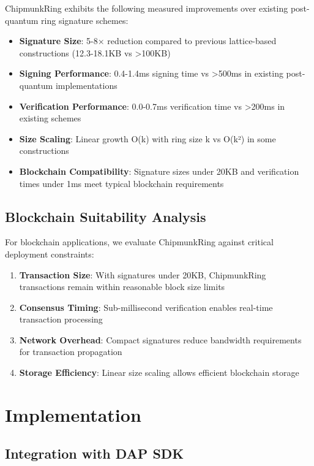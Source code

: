 \documentclass[11pt,a4paper]{article}
\begin{document}
ChipmunkRing exhibits the following measured improvements over existing post-quantum ring signature schemes:

\begin{itemize}
\item \textbf{Signature Size}: 5-8× reduction compared to previous lattice-based constructions (12.3-18.1KB vs >100KB)
\item \textbf{Signing Performance}: 0.4-1.4ms signing time vs >500ms in existing post-quantum implementations  
\item \textbf{Verification Performance}: 0.0-0.7ms verification time vs >200ms in existing schemes
\item \textbf{Size Scaling}: Linear growth O(k) with ring size k vs O(k²) in some constructions
\item \textbf{Blockchain Compatibility}: Signature sizes under 20KB and verification times under 1ms meet typical blockchain requirements
\end{itemize}

\subsection{Blockchain Suitability Analysis}

For blockchain applications, we evaluate ChipmunkRing against critical deployment constraints:

\begin{enumerate}
\item \textbf{Transaction Size}: With signatures under 20KB, ChipmunkRing transactions remain within reasonable block size limits
\item \textbf{Consensus Timing}: Sub-millisecond verification enables real-time transaction processing
\item \textbf{Network Overhead}: Compact signatures reduce bandwidth requirements for transaction propagation
\item \textbf{Storage Efficiency}: Linear size scaling allows efficient blockchain storage
\end{enumerate}

\section{Implementation}

\subsection{Integration with DAP SDK}
\end{document}

